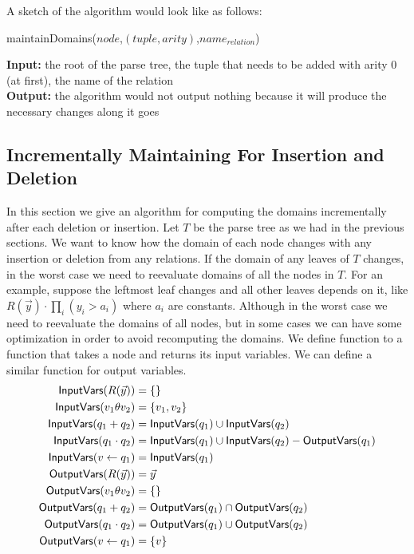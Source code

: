 \documentclass[12pt]{article}
\begin{document}
A sketch of the algorithm would look like as follows:

\begin{algorithm}[H]
\caption{maintainDomains($node$,$(tuple,arity)$,$name_{relation}$)} 
\label{alg2}
\textbf{Input:} the root of the parse tree, the tuple that needs to be added with arity 0 (at first), the name of the relation \\
\textbf{Output:} the algorithm would not output nothing because it will produce the necessary changes along it goes
\begin{algorithmic}[1]
\STATE
\end{algorithmic}
\end{algorithm}

\subsection{Incrementally Maintaining For Insertion and Deletion}
In this section we give an algorithm for computing the domains incrementally after each deletion or insertion. Let $T$ be the parse tree as we had in the previous sections. We want to know how the domain of each node changes with any insertion or deletion from any relations. If the domain of any leaves of $T$ changes, in the worst case we need to reevaluate domains of all the nodes in $T$. For an example, suppose the leftmost leaf changes and all other leaves depends on it, like $R(\vec{y})\cdot\prod_{i}{(y_{i}>a_{i})}$ where $a_{i}$ are constants.
Although in the worst case we need to reevaluate the domains of all nodes, but in some cases we can have some optimization in order to avoid recomputing the domains. We define function \InputVars{} to a function that takes a node and returns its input variables. We can define a similar function \OutputVars{} for output variables.
\begin{align}
\text{\textsf{InputVars}}(R(\vec{y}))&=\{\}\\
\text{\textsf{InputVars}}(v_{1}\theta v_{2})&=\{v_{1},v_{2}\}\\
\text{\textsf{InputVars}}(q_{1}+q_{2})&=\text{\textsf{InputVars}}(q_{1})\cup\text{\textsf{InputVars}}(q_{2})\\
\text{\textsf{InputVars}}(q_{1}\cdot q_{2})&=\text{\textsf{InputVars}}(q_{1})\cup\text{\textsf{InputVars}}(q_{2})-\text{\textsf{OutputVars}}(q_{1})\\
\text{\textsf{InputVars}}(v\gets q_{1})&=\text{\textsf{InputVars}}(q_{1})\\
\text{\textsf{OutputVars}}(R(\vec{y}))&=\vec{y}\\
\text{\textsf{OutputVars}}(v_{1}\theta v_{2})&=\{\}\\
\text{\textsf{OutputVars}}(q_{1}+q_{2})&=\text{\textsf{OutputVars}}(q_{1})\cap\text{\textsf{OutputVars}}(q_{2})\\
\text{\textsf{OutputVars}}(q_{1}\cdot q_{2})&=\text{\textsf{OutputVars}}(q_{1})\cup\text{\textsf{OutputVars}}(q_{2})\\
\text{\textsf{OutputVars}}(v\gets q_{1})&=\{v\}
\end{align}
\end{document}
